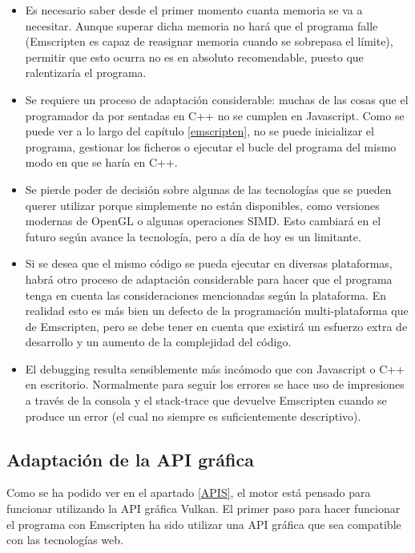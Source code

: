 \begin{itemize}
    \item Es necesario saber desde el primer momento cuanta memoria se va a necesitar. Aunque superar dicha memoria no hará que el programa falle (Emscripten es capaz de reasignar memoria cuando se sobrepasa el límite), permitir que esto ocurra no es en absoluto recomendable, puesto que ralentizaría el programa.
    
    \item Se requiere un proceso de adaptación considerable: muchas de las cosas que el programador da por sentadas en C++ no se cumplen en Javascript. Como se puede ver a lo largo del capítulo \ref{emscripten}, no se puede inicializar el programa, gestionar los ficheros o ejecutar el bucle del programa del mismo modo en que se haría en C++.
    
    \item Se pierde poder de decisión sobre algunas de las tecnologías que se pueden querer utilizar porque simplemente no están disponibles, como versiones modernas de OpenGL o algunas operaciones SIMD. Esto cambiará en el futuro según avance la tecnología, pero a día de hoy es un limitante.
    
    \item Si se desea que el mismo código se pueda ejecutar en diversas plataformas, habrá otro proceso de adaptación considerable para hacer que el programa tenga en cuenta las consideraciones mencionadas según la plataforma. En realidad esto es más bien un defecto de la programación multi-plataforma que de Emscripten, pero se debe tener en cuenta que existirá un esfuerzo extra de desarrollo y un aumento de la complejidad del código.
    
    \item El debugging resulta sensiblemente más incómodo que con Javascript o C++ en escritorio. Normalmente para seguir los errores se hace uso de impresiones a través de la consola y el stack-trace que devuelve Emscripten cuando se produce un error (el cual no siempre es suficientemente descriptivo).
\end{itemize}

\subsection{Adaptación de la API gráfica}
Como se ha podido ver en el apartado \ref{APIS}, el motor está pensado para funcionar utilizando la API gráfica Vulkan. El primer paso para hacer funcionar el programa con Emscripten ha sido utilizar una API gráfica que sea compatible con las tecnologías web.

